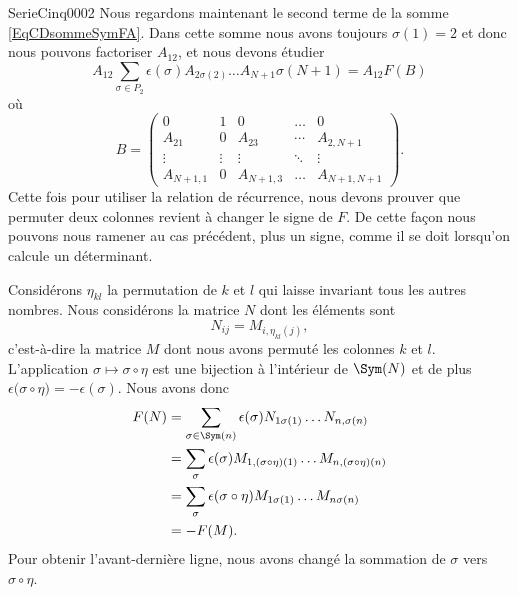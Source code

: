 \begin{corrige}{SerieCinq0002}
Nous regardons maintenant le second terme de la somme \eqref{EqCDsommeSymFA}. Dans cette somme nous avons toujours $\sigma(1)=2$ et donc nous pouvons factoriser $A_{12}$, et nous devons étudier
\begin{equation}
		A_{12}\sum_{\sigma\in P_2}\epsilon(\sigma)A_{2\sigma(2)}\ldots A_{N+1}\sigma(N+1)
		=A_{12}F(B)
\end{equation}
où
\begin{equation}
	B=\begin{pmatrix}
		0		&	1	&	0	&	\ldots	&	0\\	
		A_{21}		&	0	&	A_{23}	&	\cdots	&	A_{2,N+1}\\	
		\vdots		&	\vdots	&	\vdots	&	\ddots	&	\vdots\\	
		A_{N+1,1}	&	0	&	A_{N+1,3}	&	\ldots	&	A_{N+1,N+1}	
	\end{pmatrix}.
\end{equation}
Cette fois pour utiliser la relation de récurrence, nous devons prouver que permuter deux colonnes revient à changer le signe de $F$. De cette façon nous pouvons nous ramener au cas précédent, plus un signe, comme il se doit lorsqu'on calcule un déterminant.

Considérons $\eta_{kl}$ la permutation de $k$ et $l$ qui laisse invariant tous les autres nombres. Nous considérons la matrice $N$ dont les éléments sont 
\begin{equation}
	N_{ij}=M_{i,\eta_{kl}(j)},
\end{equation}
c'est-à-dire la matrice $M$ dont nous avons permuté les colonnes $k$ et $l$. L'application $\sigma\mapsto\sigma\circ\eta$ est une bijection à l'intérieur de $\Sym(N)$ et de plus $\epsilon\Big( \sigma\circ\eta \Big)=-\epsilon(\sigma)$. Nous avons donc
\begin{equation}
	\begin{aligned}[]
		F(N)&=\sum_{\sigma\in\Sym(n)}\epsilon(\sigma)N_{1\sigma(1)}\ldots N_{n,\sigma(n)}\\
		&=\sum_{\sigma}\epsilon(\sigma)M_{1,(\sigma\circ\eta)(1)}\ldots M_{n,(\sigma\circ\eta)(n)}\\
		&=\sum_{\sigma}\epsilon(\sigma\circ\eta)M_{1\sigma(1)}\ldots M_{n\sigma(n)}\\
		&=-F(M).
	\end{aligned}
\end{equation}
Pour obtenir l'avant-dernière ligne, nous avons changé la sommation de $\sigma$ vers $\sigma\circ\eta$.

\end{corrige}
